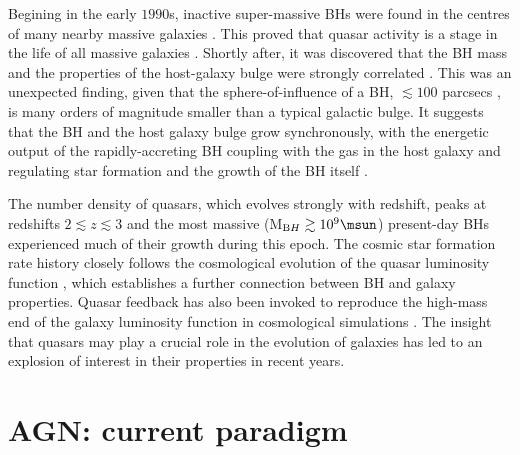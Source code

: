 Begining in the early $1990$s, inactive super-massive BHs were found in the centres of many nearby massive galaxies \citep[e.g.][]{kormendy95,ferrarese05,kormendy13}.
This proved that quasar activity is a stage in the life of all massive galaxies \citep[e.g.][]{lynden-bell69}. 
Shortly after, it was discovered that the BH mass and the properties of the host-galaxy bulge were strongly correlated \citep[e.g. the M$_{\mathrm BH}$-$\sigma$ relation;][]{ferrarese00,gebhardt00,graham01,tremaine02,marconi03,aller07,gultekin09}. 
This was an unexpected finding, given that the sphere-of-influence  of a BH, $\lesssim100$ parcsecs \citep[e.g.][]{kormendy13}, is many orders of magnitude smaller than a typical galactic bulge. 
It suggests that the BH and the host galaxy bulge grow synchronously, with the energetic output of the rapidly-accreting BH coupling with the gas in the host galaxy and regulating star formation and the growth of the BH itself \citep[e.g.][]{silk98,king03,dimatteo05,king15}. 

The number density of quasars, which evolves strongly with redshift, peaks at redshifts $2 \lesssim z \lesssim 3$ \citep[e.g.][]{brandt05,richards06b} and the most massive (M$_{\mathrm BH} \gtrsim 10^9\msun$) present-day BHs experienced much of their growth during this epoch.  
The cosmic star formation rate history closely follows the cosmological evolution of the quasar luminosity function \citep[e.g.][]{boyle98}, which establishes a further connection between BH and galaxy properties.
Quasar feedback has also been invoked to reproduce the high-mass end of the galaxy luminosity function in cosmological simulations \citep[e.g.][]{kauffmann00}.
The insight that quasars may play a crucial role in the evolution of galaxies has led to an explosion of interest in their properties in recent years. 

\section{AGN: current paradigm}

